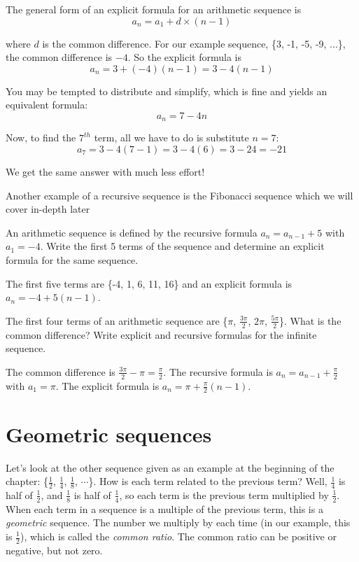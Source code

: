 The general form of an explicit formula for an arithmetic sequence is 
$$a_n = a_1 + d \times (n-1)$$

where $d$ is the common difference. For our example sequence, \{3, -1, 
-5, -9, ...\}, the common difference is $-4$. So the explicit formula 
is
$$a_n = 3 + (-4)(n-1) = 3 - 4(n-1)$$

You may be tempted to distribute and simplify, which is fine and 
yields an equivalent formula:
$$a_n = 7-4n$$

Now, to find the $7^{th}$ term, all we have to do is substitute $n=7$:
$$a_7 = 3 - 4(7 - 1) = 3 - 4(6) = 3 - 24 = -21$$

We get the same answer with much less effort!

Another example of a recursive sequence is the Fibonacci sequence which we will cover in-depth later

\begin{Exercise}[label=seq2]
An arithmetic sequence is defined by the recursive formula $a_n = 
a_{n-1} + 5$ with $a_1 = -4$. Write the first 5 terms of the sequence 
and determine an explicit formula for the same sequence.
\end{Exercise}

\begin{Answer}[ref=seq2]
The first five terms are \{-4, 1, 6, 11, 16\} and an explicit formula 
is $a_n = -4 + 5(n-1)$. 
\end{Answer}

\begin{Exercise}[label=seq3]
The first four terms of an arithmetic sequence are \{$\pi$, 
$\frac{3\pi}{2}$, $2\pi$, $\frac{5\pi}{2}$\}. What is the common 
difference? Write explicit and recursive formulas for the infinite 
sequence.
\end{Exercise}

\begin{Answer}[ref=seq3]
The common difference is $\frac{3\pi}{2} - \pi = \frac{\pi}{2}$. The 
recursive formula is $a_n = a_{n-1} + \frac{\pi}{2}$ with $a_1 = \pi$. 
The explicit formula is $a_n = \pi + \frac{\pi}{2}(n-1)$. 
\end{Answer}

\section{Geometric sequences}
Let's look at the other sequence given as an example at the beginning 
of the chapter: \{$\frac{1}{2}$, $\frac{1}{4}$, $\frac{1}{8}$, 
$\cdots$\}. How is each term related to the previous term? Well, 
$\frac{1}{4}$ is half of $\frac{1}{2}$, and $\frac{1}{8}$ is half of 
$\frac{1}{4}$, so each term is the previous term multiplied by 
$\frac{1}{2}$. When each term in a sequence is a multiple of the 
previous term, this is a \textit{geometric} sequence. The number we 
multiply by each time (in our example, this is $\frac{1}{2}$), which is 
called the \textit{common ratio}. The common ratio can be positive 
or negative, but not zero. 

